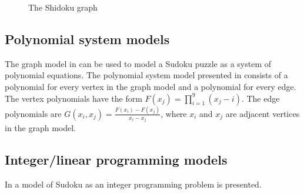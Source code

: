 \begin{figure}[h]
\centering
\begin{dot2tex}[circo,mathmode,options={--graphstyle "scale=0.40"}]
  
\end{dot2tex}
\caption{The Shidoku graph}
\end{figure}

\subsection{Polynomial system models}
\label{sec:models:polynomials}

The graph model in \cite{gagovargaset} can be used to model a Sudoku puzzle as a system of polynomial equations. The polynomial system model presented in \cite{gagovargaset} consists of a polynomial for every vertex in the graph model and a polynomial for every edge. The vertex polynomials have the form $F(x_j) = \prod_{i=1}^{9} (x_j - i)$. The edge polynomials are $G(x_i, x_j) = \frac{F(x_i) - F(x_j)}{x_i - x_j}$, where $x_i$ and $x_j$ are adjacent vertices in the graph model. 

\subsection{Integer/linear programming models}
\label{sec:models:lp}

In \cite{Bartlett2008} a model of Sudoku as an integer programming problem is presented.

